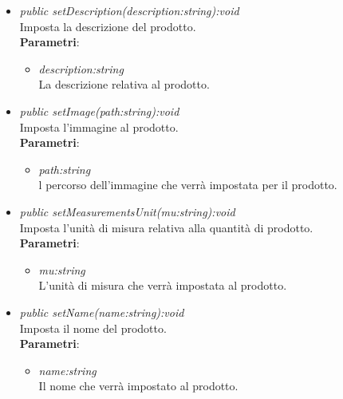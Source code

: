 \begin{itemize}
\begin{itemize}
\begin{itemize}
			\end{itemize} 
	\item \textit{public setDescription(description:string):void}\\
	Imposta la descrizione del prodotto.
				\\ \textbf{Parametri}: \begin{itemize}
				\item \textit{description:string}\\
				La descrizione relativa al prodotto.
			\end{itemize} 
	\item \textit{public setImage(path:string):void}\\
	Imposta l'immagine al prodotto.
				\\ \textbf{Parametri}: \begin{itemize}
				\item \textit{path:string}\\
				l percorso dell'immagine che verrà impostata per il prodotto.
			\end{itemize} 
	\item \textit{public setMeasurementsUnit(mu:string):void}\\
	Imposta l'unità di misura relativa alla quantità di prodotto.
				\\ \textbf{Parametri}: \begin{itemize}
				\item \textit{mu:string}\\
				L'unità di misura che verrà impostata al prodotto.
			\end{itemize} 
	\item \textit{public setName(name:string):void}\\
	Imposta il nome del prodotto.
				\\ \textbf{Parametri}: \begin{itemize}
				\item \textit{name:string}\\
				Il nome che verrà impostato al prodotto.
			\end{itemize} 


\end{itemize}
\end{itemize}
